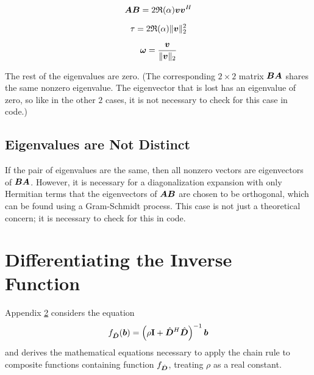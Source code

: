 \begin{appendices}
\begin{equation}
\bm{A}\bm{B} = 2
\mathfrak{R}(\alpha)\bm{v}\bm{v}^H
\end{equation}

\begin{equation}
\tau = 2
\mathfrak{R}(\alpha) \|\bm{v}\|_2^2
\end{equation}

\begin{equation}
\bm{\omega} = \frac{\bm{v}}{\|\bm{v}\|_2}
\end{equation}

The rest of the eigenvalues are zero.  (The corresponding $2 \times 2$ matrix $\bm{B}\bm{A}$ shares the same nonzero eigenvalue. The eigenvector that is lost has an eigenvalue of zero, so like in the other $2$ cases, it is not necessary to check for this case in code.)

\section{Eigenvalues are Not Distinct}

If the pair of eigenvalues are the same, then all nonzero vectors are eigenvectors of $\bm{B}\bm{A}$. However, it is necessary for a diagonalization expansion with only Hermitian terms that the eigenvectors of $\bm{A}\bm{B}$ are chosen to be orthogonal, which can be found using a Gram-Schmidt process. This case is not just a theoretical concern; it is necessary to check for this in code.



\chapter{Differentiating the Inverse Function} \label{chapter:Differentiating the Inverse Function}
Appendix \ref{chapter:Differentiating the Inverse Function} considers the equation
\begin{equation}
f_{\hat{\bm{D}}}(\bm{b}) = \left(\rho{\bf I} + \hat{\bm{D}}^H\hat{\bm{D}}\right)^{-1}\bm{b} \label{equation:Standard Inversion Function}
\end{equation}
and derives the mathematical equations necessary to apply the chain rule to composite functions containing function $f_{\hat{\bm{D}}}$, treating $\rho$ as a real constant.


\end{appendices}
